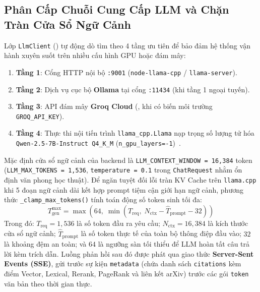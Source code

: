 \subsection{Phân Cấp Chuỗi Cung Cấp LLM và Chặn Tràn Cửa Sổ Ngữ Cảnh}
\label{sec:ch4_llm_fallback}

Lớp \texttt{LlmClient} () tự động dò tìm theo 4 tầng ưu tiên để bảo đảm hệ thống vận hành xuyên suốt trên nhiều cấu hình GPU hoặc đám mây:
\begin{enumerate}[label=\textbf{\arabic*.}]
  \item \textbf{Tầng 1}: Cổng HTTP nội bộ \texttt{:9001} (\texttt{node-llama-cpp} / \texttt{llama-server}).
  \item \textbf{Tầng 2}: Dịch vụ cục bộ \textbf{Ollama} tại cổng \texttt{:11434} (khi tầng 1 ngoại tuyến).
  \item \textbf{Tầng 3}: API đám mây \textbf{Groq Cloud} (, khi có biến môi trường \texttt{GROQ\_API\_KEY}).
  \item \textbf{Tầng 4}: Thực thi nội tiến trình \texttt{llama\_cpp.Llama} nạp trọng số lượng tử hóa \texttt{Qwen-2.5-7B-Instruct Q4\_K\_M} (\texttt{n\_gpu\_layers=-1})~\cite{qwen25report2024}.
\end{enumerate}

Mặc định cửa sổ ngữ cảnh của backend là \texttt{LLM\_CONTEXT\_WINDOW = 16,384} token (\texttt{LLM\_MAX\_TOKENS = 1,536}, \texttt{temperature = 0.1} trong \texttt{ChatRequest} nhằm ổn định văn phong học thuật). Để ngăn tuyệt đối lỗi tràn KV Cache trên \texttt{llama.cpp} khi 5 đoạn ngữ cảnh dài kết hợp prompt tiệm cận giới hạn ngữ cảnh, phương thức \texttt{\_clamp\_max\_tokens()} tính toán động số token sinh tối đa:
\begin{equation}
  T_{\text{gen}}^{\max} = \max\!\left(64,\; \min\!\left(T_{\text{req}},\; N_{\text{ctx}} - \hat{T}_{\text{prompt}} - 32\right)\right)
  \label{eq:ch4_clamp_tokens}
\end{equation}
Trong đó: $T_{\text{req}} = 1,536$ là số token đầu ra yêu cầu; $N_{\text{ctx}} = 16,384$ là kích thước cửa sổ ngữ cảnh; $\hat{T}_{\text{prompt}}$ là số token thực tế của toàn bộ thông điệp đầu vào; $32$ là khoảng đệm an toàn; và $64$ là ngưỡng sàn tối thiểu để LLM hoàn tất câu trả lời kèm trích dẫn. Luồng phản hồi sau đó được phát qua giao thức \textbf{Server-Sent Events (SSE)}, gửi trước sự kiện \texttt{metadata} (chứa danh sách \texttt{citations} kèm điểm Vector, Lexical, Rerank, PageRank và liên kết arXiv) trước các gói \texttt{token} văn bản theo thời gian thực.

